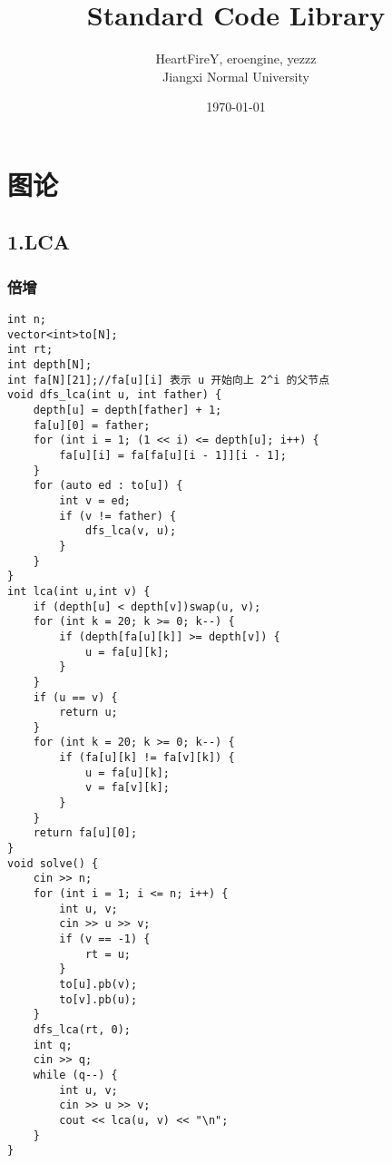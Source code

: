 \documentclass[]{article}
\date{}
\title{\vspace{50mm} \huge Standard Code Library \\[20pt]}
\author{HeartFireY, eroengine, yezzz \\[10pt] Jiangxi Normal University}
\date{\today}
\begin{document}
\begin{titlepage}

\maketitle

\end{titlepage}

\newpage

\renewcommand\labelitemi{$\bullet$}

{
\setcounter{tocdepth}{3}
\tableofcontents
\newpage
}








\hypertarget{ux56feux8bba}{%
\section{图论}\label{ux56feux8bba}}

\hypertarget{lca}{%
\subsection{1.LCA}\label{lca}}

\hypertarget{ux500dux589e}{%
\subsubsection{倍增}\label{ux500dux589e}}

\begin{verbatim}
int n;
vector<int>to[N];
int rt;
int depth[N];
int fa[N][21];//fa[u][i] 表示 u 开始向上 2^i 的父节点
void dfs_lca(int u, int father) {
    depth[u] = depth[father] + 1;
    fa[u][0] = father;
    for (int i = 1; (1 << i) <= depth[u]; i++) {
        fa[u][i] = fa[fa[u][i - 1]][i - 1];
    }
    for (auto ed : to[u]) {
        int v = ed;
        if (v != father) {
            dfs_lca(v, u);
        }
    }
}
int lca(int u,int v) {
    if (depth[u] < depth[v])swap(u, v);
    for (int k = 20; k >= 0; k--) {
        if (depth[fa[u][k]] >= depth[v]) {
            u = fa[u][k];
        }
    }
    if (u == v) {
        return u;
    }
    for (int k = 20; k >= 0; k--) {
        if (fa[u][k] != fa[v][k]) {
            u = fa[u][k];
            v = fa[v][k];
        }
    }
    return fa[u][0];
}
void solve() {
    cin >> n;
    for (int i = 1; i <= n; i++) {
        int u, v;
        cin >> u >> v;
        if (v == -1) {
            rt = u;
        }
        to[u].pb(v);
        to[v].pb(u);
    }
    dfs_lca(rt, 0);
    int q;
    cin >> q;
    while (q--) {
        int u, v;
        cin >> u >> v;
        cout << lca(u, v) << "\n";
    }
}

\end{verbatim}
\end{document}
